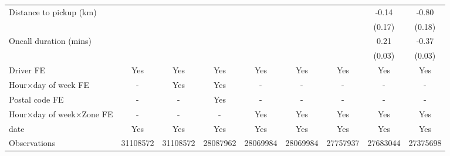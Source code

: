 \documentclass[reviewmode]{restat}
\begin{document}
\begin{appendices}
\begin{table}
{\begin{minipage}{20cm}
{\begin{tabular}{l*{8}{c}}
            \addlinespace
            Distance to pickup (km)&                     &                     &                     &                     &                     &                     &      -0.14         &      -0.80\sym{***}\\
                                &                     &                     &                     &                     &                     &                     &     (0.17)         &     (0.18)         \\
            \addlinespace
            Oncall duration (mins)&                     &                     &                     &                     &                     &                     &       0.21\sym{***}&      -0.37\sym{***}\\
                                &                     &                     &                     &                     &                     &                     &     (0.03)         &     (0.03)         \\
            \addlinespace
            Driver FE           &       {Yes}         &       {Yes}         &       {Yes}         &       {Yes}         &       {Yes}         &       {Yes}         &       {Yes}         &       {Yes}         \\
            \addlinespace
            Hour\(\times\)day of week FE&         {-}         &       {Yes}         &       {Yes}         &         {-}         &         {-}         &         {-}         &         {-}         &         {-}         \\
            \addlinespace
            Postal code FE      &         {-}         &         {-}         &       {Yes}         &         {-}         &         {-}         &         {-}         &         {-}         &         {-}         \\
            \addlinespace
            Hour\(\times\)day of week\(\times\)Zone FE&         {-}         &         {-}         &         {-}         &       {Yes}         &       {Yes}         &       {Yes}         &       {Yes}         &       {Yes}         \\
            \addlinespace
            date                &       {Yes}         &       {Yes}         &       {Yes}         &       {Yes}         &       {Yes}         &       {Yes}         &       {Yes}         &       {Yes}         \\
            \midrule
            Observations        &\num{31108572}         &\num{31108572}         &\num{28087962}         &\num{28069984}         &\num{28069984}         &\num{27757937}         &\num{27683044}         &\num{27375698}         \\

\end{tabular}}
\end{minipage}}
\end{table}
\end{appendices}
\end{document}
